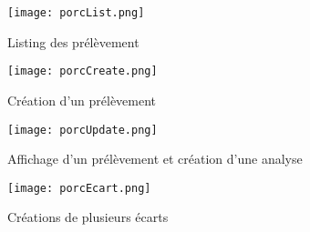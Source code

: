 \begin{figure}[htbp]
    \center 
    \texttt{[image: porcList.png]}
    \caption{Listing des prélèvement}
    \label{fig:porcList}
\end{figure}

\begin{figure}[htbp]
    \center 
    \texttt{[image: porcCreate.png]}
    \caption{Création d'un prélèvement}
    \label{fig:porcCreate}
\end{figure}

\begin{figure}[htbp]
    \center 
    \texttt{[image: porcUpdate.png]}
    \caption{Affichage d'un prélèvement et création d'une analyse}
    \label{fig:porcUpdate}
\end{figure}

\begin{figure}[htbp]
    \center 
    \texttt{[image: porcEcart.png]}
    \caption{Créations de plusieurs écarts}
    \label{fig:porcEcart}
\end{figure}